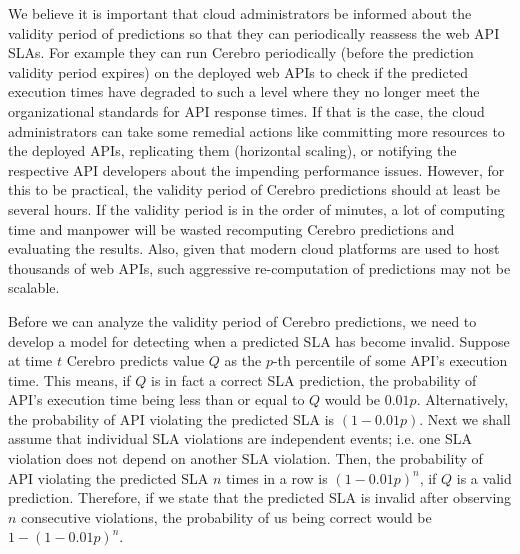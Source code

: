 
We believe
it is important that cloud administrators be informed about the validity period of predictions so that they can periodically reassess the web
API SLAs. For example they can run Cerebro periodically (before the prediction validity period expires) on the deployed web APIs to check
if the predicted execution times have degraded to such a level where they no longer meet the organizational standards for API
response times. If that is the case, the cloud administrators can take some remedial actions like committing more resources to the deployed APIs,
replicating them (horizontal scaling), or notifying the respective API developers about the impending performance issues. However,
for this to be practical, the validity period of Cerebro predictions should at least be several hours. If the validity period is in the order of minutes,
a lot of computing time and manpower will be wasted recomputing Cerebro predictions and evaluating the results. Also, given that
modern cloud platforms are used to host thousands of web APIs, such aggressive re-computation of predictions may not be scalable.

Before we can analyze the validity period of Cerebro predictions, we need to develop a model for detecting when a predicted SLA
has become invalid. Suppose at time $t$ Cerebro predicts value $Q$ as the $p$-th percentile of some API's execution time.
This means, if $Q$ is in fact a correct SLA prediction, the probability of API's execution time being less than or equal to $Q$ would be $0.01p$. 
Alternatively, the probability
of API violating the predicted SLA is $(1-0.01p)$. 
Next we shall assume that individual SLA violations are independent events; i.e. one SLA violation does 
not depend on another SLA violation.
Then,
the probability of API violating the predicted SLA $n$ times in a row is $(1-0.01p)^n$, if $Q$ is a valid prediction. 
Therefore, if we state that the 
predicted SLA is invalid after observing $n$ consecutive violations, the probability of us being correct would be $1 - (1-0.01p)^n$. 

